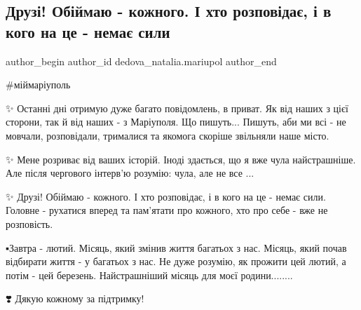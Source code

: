  
 
 
 
 

\subsection{Друзі! Обіймаю - кожного. І хто розповідає, і в кого на це - немає сили}
\label{sec:31_01_2023.fb.dedova_natalia.mariupol.1.druz__ob_imayu___ko}

\ifcmt
 author_begin
   author_id dedova_natalia.mariupol
 author_end
\fi

\#міймаріуполь 

✨ Останні дні отримую дуже багато повідомлень, в приват. Як від наших з цієї
сторони, так й від наших - з Маріуполя. Що пишуть... Пишуть, аби ми всі - не
мовчали, розповідали, трималися та якомога скоріше звільняли наше місто. 

✨ Мене розриває від ваших історій. Іноді здається, що я вже чула найстрашніше.
Але після чергового інтерв'ю розумію: чула, але не все ... 

✨ Друзі! Обіймаю - кожного. І хто розповідає, і в кого на це - немає сили.
Головне - рухатися вперед та пам'ятати про кожного, хто про себе - вже не
розповість. 

▪️Завтра - лютий. Місяць, який змінив життя багатьох з нас. Місяць, який почав
відбирати життя - у багатьох з нас. Не дуже розумію, як прожити цей лютий, а
потім - цей березень. Найстрашніший місяць для моєї родини........ 

❣️ Дякую кожному за підтримку!
